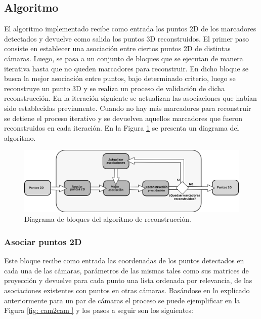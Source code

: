 \subsection{Algoritmo}
El algoritmo implementado recibe como entrada los puntos 2D de los marcadores detectados y devuelve como salida los puntos 3D reconstruidos. El primer paso consiste en establecer una asociación entre ciertos puntos 2D de distintas cámaras. Luego, se pasa a un conjunto de bloques que se ejecutan de manera iterativa hasta que no queden marcadores para reconstruir. En dicho bloque se busca la mejor asociación entre puntos, bajo determinado criterio, luego se reconstruye un punto 3D y se realiza un proceso de validación de dicha reconstrucción. En la iteración siguiente se actualizan las asociaciones que habían sido establecidas previamente. Cuando no hay más marcadores para reconstruir se detiene el proceso iterativo y se devuelven aquellos marcadores que fueron reconstruidos en cada iteración. En la Figura \ref{fig: diagrama algoritmo} se presenta un diagrama del algoritmo.

\begin{figure}[ht!]
\begin{center}
\includegraphics[scale=0.35]{../imagenes/Reconstruccion/bloques_reconstruccion}
\caption{Diagrama de bloques del algoritmo de reconstrucción.}
\label{fig: diagrama algoritmo}
\end{center}
\end{figure}

\subsubsection{Asociar puntos 2D}\label{seccion_asociar2D_uno}

Este bloque recibe como entrada las coordenadas de los puntos detectados en cada una de las cámaras, parámetros de las mismas tales como sus matrices de proyección y devuelve para cada punto una lista ordenada por relevancia, de las asociaciones existentes con puntos en otras cámaras.
Basándose en lo explicado anteriormente para un par de cámaras el proceso  se puede ejemplificar  en la Figura \ref{fig: cam2cam } y los pasos a seguir son los siguientes:

